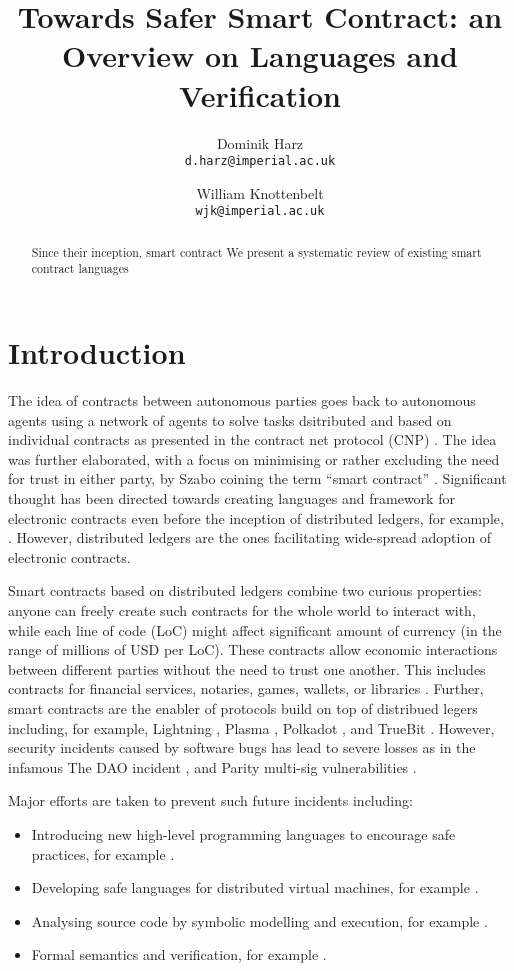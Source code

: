 \documentclass{article}
\title{Towards Safer Smart Contract: an Overview on Languages and Verification}
\date{}
\author{
Dominik Harz\\ \texttt{d.harz@imperial.ac.uk} \and
William Knottenbelt\\ \texttt{wjk@imperial.ac.uk}
}
\begin{document}
\maketitle

\begin{abstract}
Since their inception, smart contract
We present a systematic review of existing smart contract languages
\end{abstract}

\section{Introduction}
The idea of contracts between autonomous parties goes back to autonomous agents using a network of agents to solve tasks dsitributed and based on individual contracts as presented in the contract net protocol (CNP) \cite{Smith1980,FIPA2002}.
The idea was further elaborated, with a focus on minimising or rather excluding the need for trust in either party, by Szabo coining the term ``smart contract'' \cite{Szabo1997}.
Significant thought has been directed towards creating languages and framework for electronic contracts even before the inception of distributed ledgers, for example, \cite{Andersen2006,Kyas2008,Xu2004}.
However, distributed ledgers are the ones facilitating wide-spread adoption of electronic contracts.


Smart contracts based on distributed ledgers combine two curious properties: anyone can freely create such contracts for the whole world to interact with, while each line of code (LoC) might affect significant amount of currency (in the range of millions of USD per LoC).
These contracts allow economic interactions between different parties without the need to trust one another.
This includes contracts for financial services, notaries, games, wallets, or libraries \cite{Bartoletti2017}.
Further, smart contracts are the enabler of protocols build on top of distribued legers including, for example, Lightning \cite{Poon2016}, Plasma \cite{Poon2017}, Polkadot \cite{Wood2017}, and TrueBit \cite{Teutsch2017}.
However, security incidents caused by software bugs has lead to severe losses as in the infamous The DAO incident \cite{Daian2016}, and Parity multi-sig vulnerabilities \cite{Breidenbach2017Parity,ParityTech2017}. 


Major efforts are taken to prevent such future incidents including:
\begin{itemize}
\item Introducing new high-level programming languages to encourage safe practices, for example  \cite{Hirai2018Bamboo,Ethereum2018Vyper,Schrans2018}.
\item Developing safe languages for distributed virtual machines, for example \cite{Sergey2018,DynamicLedgerSolutions2017,Popejoy2017,Kasampalis2018}.
\item Analysing source code by symbolic modelling and execution, for example \cite{Luu2016,Tsankov2017,Kalra2018,Albert2018}.
\item Formal semantics and verification, for example \cite{Bhargavan2016,Hildenbrandt2017,Hirai2017}.
\end{itemize}
\end{document}
